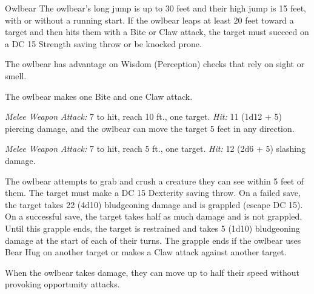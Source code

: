 \documentclass[10pt,a4paper,twoside,fancy,bg=print,twocolumn,openany,nodeprecatedcode]{dndbook}
\begin{document}
\begin{DndMonster}[float=t]{Owlbear}
  \DndMonsterBasics[
  armor-class = {13 (natural armor)},
  hit-points = {\DndDice{11d10 + 22}},
  speed = {40 ft.}
  ]
  \DndMonsterAbilityScores[
   str = 21,
   dex = 12,
   con = 15,
   int = 5,
   wis = 12,
   cha = 6
  ]
  \DndMonsterDetails[
  skills = {Perception +3},
  condition-immunities = {frightened},
  senses = {darkvision 60 ft., passive perception 13},
  challenge = 3,
  ]
  The owlbear's long jump is up to 30 feet and their high jump is 15 feet, with or without a running start. If the owlbear leaps at least 20 feet toward a target and then hits them with a Bite or Claw attack, the target must succeed on a DC 15 Strength saving throw or be knocked prone.
  
  The owlbear has advantage on Wisdom (Perception) checks that rely on sight or smell.
  
  The owlbear makes one Bite and one Claw attack.
  
  \textsl{Melee Weapon Attack:} 7 to hit, reach 10 ft., one target. \textsl{Hit:} 11 (1d12 + 5) piercing damage, and the owlbear can move the target 5 feet in any direction.
  
  \textsl{Melee Weapon Attack:} 7 to hit, reach 5 ft., one target. \textsl{Hit:} 12 (2d6 + 5) slashing damage.
  
  The owlbear attempts to grab and crush a creature they can see within 5 feet of them. The target must make a DC 15 Dexterity saving throw. On a failed save, the target takes 22 (4d10) bludgeoning damage and is grappled (escape DC 15). On a successful save, the target takes half as much damage and is not grappled. Until this grapple ends, the target is restrained and takes 5 (1d10) bludgeoning damage at the start of each of their turns. The grapple ends if the owlbear uses Bear Hug on another target or makes a Claw attack against another target.
  
  When the owlbear takes damage, they can move up to half their speed without provoking opportunity attacks.
  
  \end{DndMonster}
  
\end{document}
